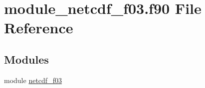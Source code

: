 \hypertarget{module__netcdf__f03_8f90}{}\section{module\+\_\+netcdf\+\_\+f03.\+f90 File Reference}
\label{module__netcdf__f03_8f90}
\subsection*{Modules}
\begin{DoxyCompactItemize}
\item 
module \hyperlink{namespacenetcdf__f03}{netcdf\+\_\+f03}
\end{DoxyCompactItemize}
